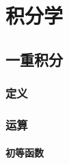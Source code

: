 \documentclass[12pt]{book}
\begin{document}
\chapter{积分学}




\section{一重积分}


\subsection{定义}


\subsection{运算}

\clearpage
\subsubsection{初等函数}
\end{document}
